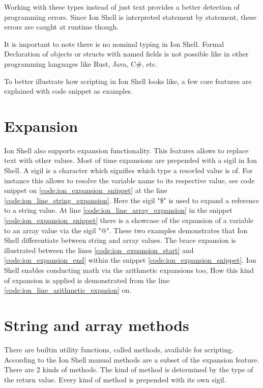 Working with these types instead of just text provides a better detection of programming errors.
Since Ion Shell is interpreted statement by statement, these errors are caught at runtime though.

It is important to note there is no nominal typing in Ion Shell.
Formal Declaration of objects or structs with named fields is not possible like in other programming languages like Rust, Java, C\#, etc.

To better illustrate how scripting in Ion Shell looks like, a few core features are explained
with code snippet as examples.

\clearpage

\section{Expansion}\label{ion_shell_lang_expansion}

Ion Shell also supports expansion functionality.
This features allows to replace text with other values.
Most of time expansions are prepended with a sigil in Ion Shell.
A sigil is a character which signifies which type a resovled value is of.
For instance this allows to resolve the variable name to its respective value, see code snippet
on \ref{code:ion_expansion_snippet} at the line \ref{code:ion_line_string_expansion}.
Here the sigil "\$" is used to expand a reference to a string value.
At line \ref{code:ion_line_array_expansion} in the snippet \ref{code:ion_expansion_snippet}
there is a showcase of the expansion of a variable to an array value via the sigil "@".
These two examples demonstrates that Ion Shell differentiate between string and array values.
The brace expansion is illustrated between the lines \ref{code:ion_expansion_start} and \ref{code:ion_expansion_end}
within the snippet \ref{code:ion_expansion_snippet}.
Ion Shell enables conducting math via the arithmetic expansions too,
How this kind of expansion is applied is demonstrated from the line \ref{code:ion_line_arithmetic_expasion} on.


\clearpage

\section{String and array methods}\label{ion_shell_lang_methods}

There are builtin utility functions, called methods, available for scripting.
According to the Ion Shell manual methods are a subset of the expansion feature.
There are 2 kinds of methods.
The kind of method is determined by the type of the return value.
Every kind of method is prepended with its own sigil.

